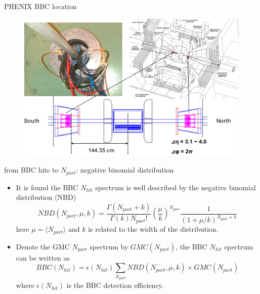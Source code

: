 \documentclass{beamer}
\begin{document}
\begin{frame}{PHENIX BBC location}
  \begin{figure}
    \includegraphics[width=\textwidth]{plots/PHENIX_BBC_location.pdf}
  \end{figure}
\end{frame}


\begin{frame}{from BBC hits to $N_{part}$: negative binomial distribution}
  \begin{itemize}
    \item It is found the BBC $N_{hit}$ spectrum is well described by the negative binomial distribution (NBD)
    \begin{equation}
		NBD(N_{part},\mu,k)=\frac{\Gamma(N_{part}+k)}{\Gamma(k)N_{part}!}\left( \frac{\mu}{k} \right)^{N_{part}}\frac{1}{(1+\mu/k)^{N_{part}+k}}
		\end{equation}
		here $\mu=\langle N_{part}\rangle$ and $k$ is related to the width of the distribution.
		
		\item Denote the GMC $N_{part}$ spectrum by $GMC(N_{part})$, the BBC $N_{hit}$ spectrum can be written as
		\begin{equation}\label{eq:bbcformula}
		BBC(N_{hit})=\epsilon(N_{hit})\sum\limits_{N_{part}}NBD(N_{part},\mu,k)\times GMC(N_{part})
		\end{equation}
		where $\epsilon(N_{hit})$ is the BBC detection efficiency.
  \end{itemize}
\end{frame}
\end{document}
